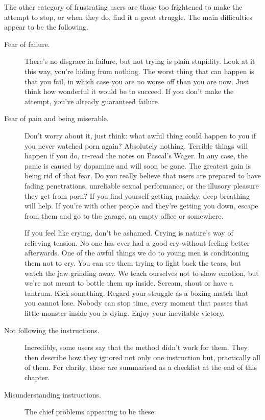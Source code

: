 \documentclass[
]{book}
\begin{document}
The other category of frustrating users are those too frightened to make the attempt to stop, or when they do, find it a great struggle. The main difficulties appear to be the following.

\begin{description}
\item[Fear of failure.]
There's no disgrace in failure, but not trying is plain stupidity. Look at it this way, you're hiding from nothing. The worst thing that can happen is that you fail, in which case you are no worse off than you are now. Just think how wonderful it would be to succeed. If you don't make the attempt, you've already guaranteed failure.
\item[Fear of pain and being miserable.]
Don't worry about it, just think: what awful thing could happen to you if you never watched porn again? Absolutely nothing. Terrible things will happen if you do, re-read the notes on Pascal's Wager. In any case, the panic is caused by dopamine and will soon be gone. The greatest gain is being rid of that fear. Do you really believe that users are prepared to have fading penetrations, unreliable sexual performance, or the illusory pleasure they get from porn? If you find yourself getting panicky, deep breathing will help. If you're with other people and they're getting you down, escape from them and go to the garage, an empty office or somewhere.

If you feel like crying, don't be ashamed. Crying is nature's way of relieving tension. No one has ever had a good cry without feeling better afterwards. One of the awful things we do to young men is conditioning them not to cry. You can see them trying to fight back the tears, but watch the jaw grinding away. We teach ourselves not to show emotion, but we're not meant to bottle them up inside. Scream, shout or have a tantrum. Kick something. Regard your struggle as a boxing match that you cannot lose. Nobody can stop time, every moment that passes that little monster inside you is dying. Enjoy your inevitable victory.
\item[Not following the instructions.]
Incredibly, some users say that the method didn't work for them. They then describe how they ignored not only one instruction but, practically all of them. For clarity, these are summarised as a checklist at the end of this chapter.
\item[Misunderstanding instructions.]
The chief problems appearing to be these:


\end{description}
\end{document}
